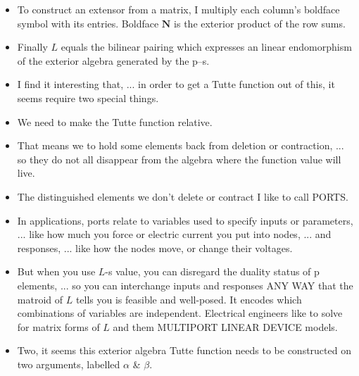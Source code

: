 \documentclass[14pt]{extarticle}
\begin{document}
{\begin{itemize}
\item
  To construct an extensor from a matrix,
  I multiply each column's boldface symbol with its entries.
  Boldface $\mathbf{N}$ is the exterior product of the row sums.

\item
  Finally $L$ equals the bilinear pairing which expresses an linear endomorphism
  of the exterior algebra generated by the p--s.

\item
  I find it interesting that, ... in order to get a Tutte function out
  of this, it seems require two special things.

\item
 We need to make the Tutte function relative.

\item
  That means we to hold some elements back from deletion or contraction,
  ... so they do not all disappear from the algebra where the function value
  will live.

\item
  The distinguished elements we don't delete or contract I like to call PORTS.


\item In applications, ports relate to variables used to specify inputs
  or parameters, ... like how much you force or electric current you
  put into nodes, ...
  and responses, ... like how the nodes move, or change their voltages.

\item But when you use $L$-s value, you can disregard the duality
  status of p elements, ... so 
  you can interchange inputs and responses ANY WAY that the
  matroid of $L$ tells you is feasible and well-posed.  It encodes which
  combinations of variables are independent.
  Electrical engineers like to solve for matrix forms of $L$ and 
  them MULTIPORT LINEAR DEVICE models.


\item
  Two, it seems this exterior algebra Tutte function needs to be constructed on 
  two arguments, labelled $\alpha$ \& $\beta$.


\end{itemize}}
\end{document}
